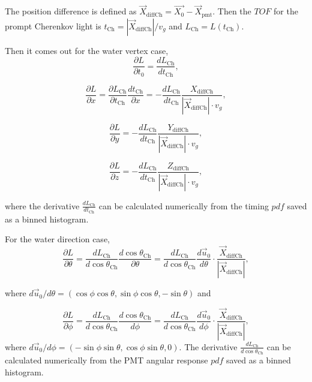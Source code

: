 The position difference is defined as $\vec{X}_{{\mathrm{diffCh}}} = \vec{X_0}-\vec{X}_{\mathrm{pmt}}$. Then the $TOF$ for the prompt Cherenkov light is $t_{\mathrm{Ch}}=|\vec{X}_{{\mathrm{diffCh}}}|/v_g$ and $L_{\mathrm{Ch}}=L(t_{\mathrm{Ch}})$.

Then it comes out for the water vertex case,
\begin{equation}
\frac{\partial L}{\partial t_0}=\frac{dL_{\mathrm{Ch}}}{dt_{\mathrm{Ch}}},
\end{equation}

\begin{equation}
\frac{\partial L}{\partial x}=\frac{\partial L_{\mathrm{Ch}}}{\partial t_{\mathrm{Ch}}}\frac{dt_{\mathrm{Ch}}}{\partial x}=-\frac{dL_{\mathrm{Ch}}}{dt_{\mathrm{Ch}}}\frac{X_{{\mathrm{diffCh}}}}{|\vec{X}_{{\mathrm{diffCh}}}|\cdot v_g},
\end{equation}

\begin{equation}
\frac{\partial L}{\partial y}=-\frac{dL_{\mathrm{Ch}}}{dt_{\mathrm{Ch}}}\frac{Y_{{\mathrm{diffCh}}}}{|\vec{X}_{{\mathrm{diffCh}}}|\cdot v_g},
\end{equation}

\begin{equation}
\frac{\partial L}{\partial z}=-\frac{dL_{\mathrm{Ch}}}{dt_{\mathrm{Ch}}}\frac{Z_{{\mathrm{diffCh}}}}{|\vec{X}_{{\mathrm{diffCh}}}|\cdot v_g},
\end{equation}

where the derivative $\frac{dL_{\mathrm{Ch}}}{dt_{\mathrm{Ch}}}$ can be calculated numerically from the timing $pdf$ saved as a binned histogram.

For the water direction case,
\begin{equation}
\frac{\partial L}{\partial\theta}=\frac{dL_{\mathrm{Ch}}}{d\cos\theta_{\mathrm{Ch}}}\frac{d\cos\theta_{\mathrm{Ch}}}{\partial\theta}
=\frac{dL_{\mathrm{Ch}}}{d\cos\theta_{\mathrm{Ch}}}\frac{d\vec{u}_0}{d\theta}\cdot\frac{\vec{X}_{{\mathrm{diffCh}}}}{|\vec{X}_{{\mathrm{diffCh}}}|},
\end{equation}

where $d\vec{u}_0/d\theta=(\cos\phi\cos\theta, \sin\phi\cos\theta, -\sin\theta)$ and 

\begin{equation}
\frac{\partial　L}{\partial\phi}=\frac{dL_{\mathrm{Ch}}}{d\cos\theta_{\mathrm{Ch}}}\frac{d\cos\theta_{\mathrm{Ch}}}{d\phi}
=\frac{dL_{\mathrm{Ch}}}{d\cos\theta_{\mathrm{Ch}}}\frac{d\vec{u}_0}{d\phi}\cdot\frac{\vec{X}_{{\mathrm{diffCh}}}}{|\vec{X}_{{\mathrm{diffCh}}}|},
\end{equation} 
where $d\vec{u}_0/d\phi=(-\sin\phi\sin\theta, \cos\phi\sin\theta, 0)$. The derivative $\frac{dL_{\mathrm{Ch}}}{d\cos\theta_{\mathrm{Ch}}}$ can be calculated numerically from the PMT angular response $pdf$ saved as a binned histogram.

